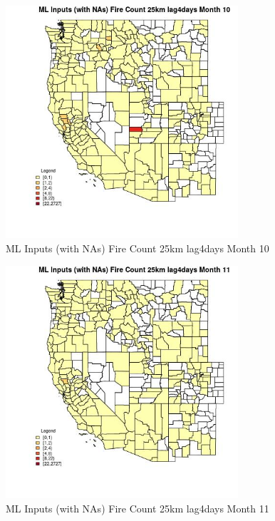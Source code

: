 \begin{figure} 
\centering  
\includegraphics[width=0.77\textwidth]{Code_Outputs/Report_ML_input_PM25_Step4_part_f_de_duplicated_aveswNAs_CountyFire_Count_25km_lag4daysmedianMonth10.jpg} 
\caption{\label{fig:Report_ML_input_PM25_Step4_part_f_de_duplicated_aveswNAsCountyFire_Count_25km_lag4daysmedianMonth10}ML Inputs (with NAs) Fire Count 25km lag4days Month 10} 
\end{figure} 
 

\begin{figure} 
\centering  
\includegraphics[width=0.77\textwidth]{Code_Outputs/Report_ML_input_PM25_Step4_part_f_de_duplicated_aveswNAs_CountyFire_Count_25km_lag4daysmedianMonth11.jpg} 
\caption{\label{fig:Report_ML_input_PM25_Step4_part_f_de_duplicated_aveswNAsCountyFire_Count_25km_lag4daysmedianMonth11}ML Inputs (with NAs) Fire Count 25km lag4days Month 11} 
\end{figure} 
 

